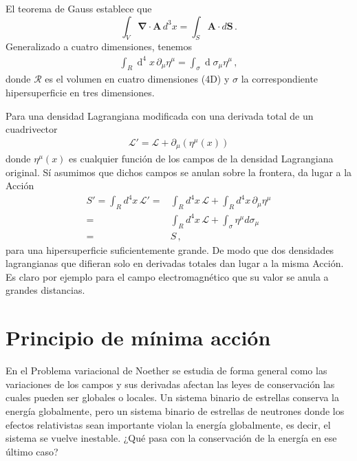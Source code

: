 \begin{frame}
El teorema de Gauss establece que
\begin{equation}
\int_V\boldsymbol{\nabla}\cdot\mathbf{A}\,d^3x=
 \int_S\mathbf{A}\cdot d\mathbf{S}\,.
\end{equation}
Generalizado a cuatro dimensiones, tenemos
\begin{align}
  \label{eq:gauss4d}
\int_{R} \operatorname{d}^4x\,\partial_{\mu} \eta^{\mu}=
\int_{\sigma} \operatorname{d}\sigma_{\mu} \eta^{\mu}\,,   
\end{align}
donde $\mathcal{R}$ es el volumen en cuatro dimensiones (4D) y $\sigma$ la correspondiente hipersuperficie en tres dimensiones.
\end{frame}

Para una densidad Lagrangiana modificada con una derivada total de un cuadrivector
\begin{align}
  \mathcal{L}'=\mathcal{L}+\partial_\mu(\eta^{\mu}(x))
\end{align}
donde $\eta^{\mu}(x)$ es cualquier función de los campos de la densidad Lagrangiana original. Sí asumimos que dichos campos se anulan  sobre la frontera, da lugar a la Acción
\begin{align}
  S'=\int_{R}d^4x\,\mathcal{L}'=&\int_{R}d^4x\,\mathcal{L}+\int_R d^4x\,\partial_\mu\eta^{\mu}\nonumber\\
  =&\int_{R}d^4x\,\mathcal{L}+\int_\sigma \eta^{\mu} d\sigma_{\mu}\nonumber\\
  =&S\,,
\end{align}
para una hipersuperficie suficientemente grande. De modo que dos densidades lagrangianas que difieran solo en derivadas totales dan lugar a la misma Acción. Es claro por ejemplo para el campo electromagnético que su valor se anula a grandes distancias.

\section{Principio de mínima acción}
\label{sec:principio-de-minima-call}


En el Problema variacional de Noether se estudia de forma general como las variaciones de los campos y sus derivadas afectan las leyes de conservación las cuales pueden ser globales o locales. Un sistema binario de estrellas conserva la energía globalmente, pero un sistema binario de estrellas de neutrones donde los efectos relativistas sean importante violan la energía globalmente, es decir, el sistema se vuelve inestable. ¿Qué pasa con la conservación de la energía en ese último caso?



